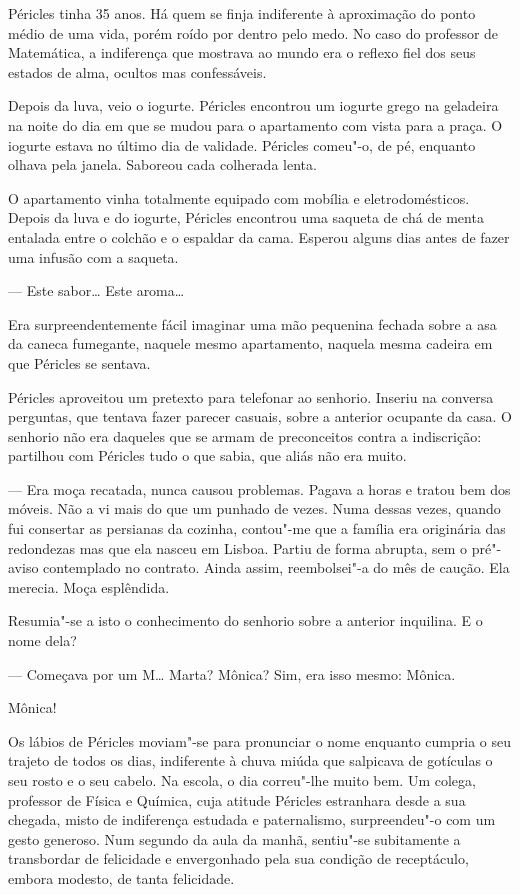 Péricles tinha 35 anos. Há quem se finja indiferente à aproximação do
ponto médio de uma vida, porém roído por dentro pelo medo. No caso do
professor de Matemática, a indiferença que mostrava ao mundo era o
reflexo fiel dos seus estados de alma, ocultos mas confessáveis.

Depois da luva, veio o iogurte. Péricles encontrou um iogurte grego na geladeira
na noite do dia em que se mudou para o apartamento com vista
para a praça. O iogurte estava no último dia de validade. Péricles
comeu"-o, de pé, enquanto olhava pela janela. Saboreou cada colherada
lenta.

O apartamento vinha totalmente equipado com mobília e eletrodomésticos.
Depois da luva e do iogurte, Péricles encontrou uma saqueta de chá de
menta entalada entre o colchão e o espaldar da cama. Esperou alguns dias
antes de fazer uma infusão com a saqueta.

--- Este sabor\ldots{} Este aroma\ldots{}

Era surpreendentemente fácil imaginar uma mão pequenina fechada sobre
a asa da caneca fumegante, naquele mesmo apartamento, naquela mesma
cadeira em que Péricles se sentava.

Péricles aproveitou um pretexto para telefonar ao senhorio. Inseriu na
conversa perguntas, que tentava fazer parecer casuais, sobre a anterior
ocupante da casa. O senhorio não era daqueles que se armam de
preconceitos contra a indiscrição: partilhou com Péricles tudo o que
sabia, que aliás não era muito.

--- Era moça recatada, nunca causou problemas. Pagava a horas e tratou bem
  dos móveis. Não a vi mais do que um punhado de vezes. Numa dessas
  vezes, quando fui consertar as persianas da cozinha, contou"-me que a
  família era originária das redondezas mas que ela nasceu em Lisboa.
  Partiu de forma abrupta, sem o pré"-aviso contemplado no contrato.
  Ainda assim, reembolsei"-a do mês de caução. Ela merecia. Moça esplêndida.

Resumia"-se a isto o conhecimento do senhorio sobre a anterior
inquilina. E o nome dela?

--- Começava por um M\ldots{} Marta? Mônica? Sim, era isso mesmo: Mônica.


Mônica!

Os lábios de Péricles moviam"-se para pronunciar o nome enquanto cumpria
o seu trajeto de todos os dias, indiferente à chuva miúda que salpicava
de gotículas o seu rosto e o seu cabelo. Na escola, o dia correu"-lhe
muito bem. Um colega, professor de Física e Química, cuja atitude
Péricles estranhara desde a sua chegada, misto de indiferença estudada e
paternalismo, surpreendeu"-o com um gesto generoso. Num segundo da aula
da manhã, sentiu"-se subitamente a transbordar de felicidade e envergonhado pela sua condição de receptáculo, embora
modesto, de tanta felicidade.

